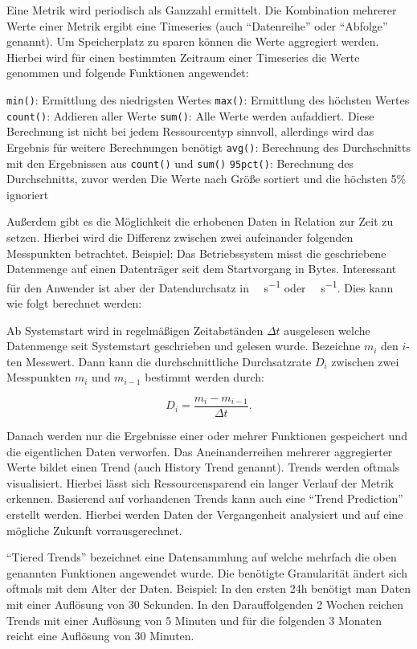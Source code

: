 Eine Metrik wird periodisch als Ganzzahl ermittelt. Die Kombination mehrerer
Werte einer Metrik ergibt eine Timeseries (auch ``Datenreihe'' oder ``Abfolge''
genannt). Um Speicherplatz zu sparen können die Werte aggregiert werden.
Hierbei wird für einen bestimmten Zeitraum einer Timeseries die Werte genommen
und folgende Funktionen angewendet:

\begin{outline}
  \1 \lstinline|min()|: Ermittlung des niedrigsten Wertes
  \1 \lstinline|max()|: Ermittlung des höchsten Wertes
  \1 \lstinline|count()|: Addieren aller Werte
  \1 \lstinline|sum()|: Alle Werte werden aufaddiert. Diese Berechnung ist nicht
  bei jedem Ressourcentyp sinnvoll, allerdings wird das Ergebnis für weitere
  Berechnungen benötigt
  \1 \lstinline|avg()|: Berechnung des Durchschnitts mit den Ergebnissen aus
  \lstinline|count()| und \lstinline|sum()|
  \1 \lstinline|95pct()|: Berechnung des Durchschnitts, zuvor werden Die Werte
  nach Größe sortiert und die höchsten 5\% ignoriert
\end{outline}

Außerdem gibt es die Möglichkeit die erhobenen Daten in Relation zur Zeit zu
setzen. Hierbei wird die Differenz zwischen zwei aufeinander folgenden
Messpunkten betrachtet.  Beispiel: Das Betriebssystem misst die geschriebene
Datenmenge auf einen Datenträger seit dem Startvorgang in Bytes. Interessant
für den Anwender ist aber der Datendurchsatz in \si{\mega\byte\per\second} oder
\si{\giga\byte\per\second}. Dies kann wie folgt berechnet werden:

Ab Systemstart wird in regelmäßigen Zeitabständen $\Delta t$ ausgelesen welche
Datenmenge seit Systemstart geschrieben und gelesen wurde. Bezeichne $m_i$ den
$i$-ten Messwert. Dann kann die durchschnittliche Durchsatzrate $D_i$ zwischen
zwei Messpunkten $m_i$ und $m_{i-1}$ bestimmt werden durch:

\[ D_i = \frac{m_{i} - m_{i-1}}{\Delta t}.\]

Danach werden nur die Ergebnisse einer oder mehrer Funktionen gespeichert und
die eigentlichen Daten verworfen. Das Aneinanderreihen mehrerer aggregierter
Werte bildet einen Trend (auch History Trend genannt). Trends werden oftmals
visualisiert. Hierbei lässt sich Ressourcensparend ein langer Verlauf der
Metrik erkennen. Basierend auf vorhandenen Trends kann auch eine ``Trend
Prediction'' erstellt werden. Hierbei werden Daten der Vergangenheit analysiert
und auf eine mögliche Zukunft vorrausgerechnet.

``Tiered Trends'' bezeichnet eine Datensammlung auf welche mehrfach die oben
genannten Funktionen angewendet wurde. Die benötigte Granularität ändert sich
oftmals mit dem Alter der Daten. Beispiel: In den ersten 24h benötigt man Daten
mit einer Auflösung von 30 Sekunden. In den Darauffolgenden 2 Wochen reichen
Trends mit einer Auflösung von 5 Minuten und für die folgenden 3 Monaten reicht
eine Auflösung von 30 Minuten.

